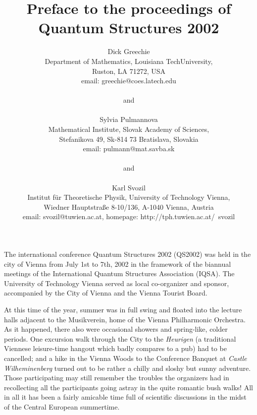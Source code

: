 \documentclass{article}
\begin{document}
\title{Preface to the proceedings of Quantum Structures 2002}
\author{
Dick Greechie\\
Department of Mathematics, Louisiana TechUniversity, \\
Ruston, LA 71272, USA\\
email: greechie@coes.latech.edu\\ \\
and\\ \\
Sylvia Pulmannova \\
Mathematical Institute, Slovak Academy of Sciences,\\
Stefanikova 49,
Sk-814 73
Bratislava,
Slovakia \\
email: pulmann@mat.savba.sk\\ \\
and\\ \\
Karl Svozil\\
Institut f\"ur Theoretische Physik, University of Technology Vienna,  \\
Wiedner Hauptstra\ss e 8-10/136, A-1040 Vienna, Austria\\
email: svozil@tuwien.ac.at, homepage: http://tph.tuwien.ac.at/~svozil}

\maketitle



The international conference Quantum Structures 2002 (QS2002) was held in the city of Vienna
from July 1st to 7th, 2002 in the framework of the
biannual meetings of the International Quantum Structures Association (IQSA).
The University of Technology Vienna served as local co-organizer and sponsor,
accompanied by the City of Vienna and the Vienna Tourist Board.


At this time of the year,
summer was in full swing and floated into the lecture halls adjacent
to the Musikverein, home of the Vienna Philharmonic Orchestra.
As it happened, there also were occasional showers and spring-like, colder periods.
One excursion walk through the City to the {\em Heurigen}
(a traditional Viennese leisure-time hangout which badly compares to a pub) had to be cancelled;
and a hike in the Vienna Woods to the Conference Banquet at
{\it Castle Wilheminenberg} turned out to be rather a chilly and sloshy but sunny adventure.
Those participating may still remember the troubles the organizers had in recollecting all the
participants going astray in the quite romantic bush walks!
All in all it has been a fairly amicable time
full of scientific discussions in the midst of the Central European summertime.
\end{document}
